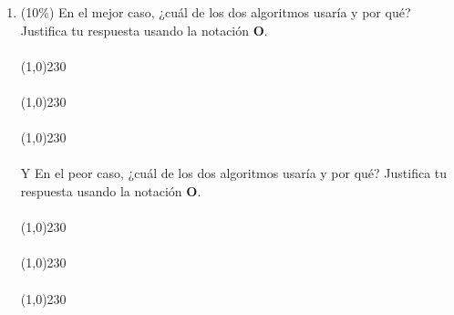 \documentclass[10 pt]{article}
\begin{document}
\begin{enumerate}[label=(\Alph*)]
  \item (10\%) En el mejor caso, ¿cuál de los dos algoritmos usaría y por qué? Justifica tu respuesta usando la notación \textbf{O}.
  \\ \\
  \line(1,0){230}
  \\ \\
  \line(1,0){230}
  \\ \\
  \line(1,0){230}\\ \\
  Y En el peor caso, ¿cuál de los dos algoritmos usaría y por qué? Justifica tu respuesta usando la notación \textbf{O}.
  \\ \\
  \line(1,0){230}
  \\ \\
  \line(1,0){230}
  \\ \\
  \line(1,0){230}
\end{enumerate}
\end{document}
